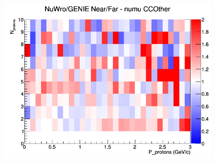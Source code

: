 \documentclass[12pt]{article}
\begin{document}
\begin{figure}[h]
\endminipage
{}
\includegraphics[width=\linewidth]{N_P/nominal/protons/ratios/CCOther_NuWro_GENIE_numu_NF_N_P.png}
\endminipage
\newline
\end{figure}
\clearpage
\end{document}
